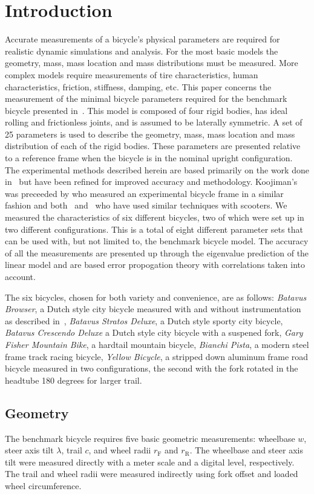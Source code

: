 \documentclass{bmd2010a}
\begin{document}
\section*{Introduction}
Accurate measurements of a bicycle's physical parameters are required for
realistic dynamic simulations and analysis. For the most basic models the
geometry, mass, mass location and mass distributions must be measured. More complex models
require measurements of tire characteristics, human characteristics, friction, stiffness, damping, etc. This
paper concerns the measurement of the minimal bicycle parameters required for
the benchmark bicycle presented in~\cite{Meijaard2007}. This
model is composed of four rigid bodies, has ideal rolling and frictionless joints,
and is assumed to be laterally symmetric. A set of 25
parameters is used to describe the geometry, mass, mass location and
mass distribution of each of the rigid bodies. These parameters are presented
relative to a reference frame when the bicycle is in the nominal upright
configuration. The experimental methods described herein are based primarily on the work
done in~\cite{Kooijman2006} but have been refined for improved accuracy and
methodology. Koojiman's was preceeded by \cite{Roland1971} who measured an experimental bicycle frame in a
similar fashion and both~\cite{Dohring1953} and~\cite{Singh1971} who have used
similar techniques with scooters. We measured the characteristics of six
different bicycles, two of which were set up in two different configurations.
This is a total of eight different parameter sets that can be used with, but not
limited to, the benchmark bicycle model. The accuracy of all the measurements
are presented up through the eigenvalue prediction of the linear model and are
based error propogation theory with correlations taken into account.

The six bicycles, chosen for both variety and convenience, are as follows:
\emph{Batavus Browser}, a Dutch style city bicycle measured with and without
instrumentation as described in~\cite{Kooijman2009a}, \emph{Batavus Stratos
Deluxe}, a Dutch style sporty city bicycle, \emph{Batavus Crescendo Deluxe} a
Dutch style city bicycle with a suspened fork, \emph{Gary Fisher Mountain
Bike}, a hardtail mountain bicycle, \emph{Bianchi Pista}, a modern steel frame
track racing bicycle, \emph{Yellow Bicycle}, a stripped down aluminum frame
road bicycle measured in two configurations, the second with the fork rotated
in the headtube 180 degrees for larger trail.
\subsection*{Geometry}
The benchmark bicycle requires five basic geometric measurements: wheelbase
$w$, steer axis tilt $\lambda$, trail $c$, and wheel radii $r_\mathrm{F}$
and $r_\mathrm{R}$. The wheelbase and steer axis tilt were measured directly
with a meter scale and a digital level, respectively. The trail and wheel radii were
measured indirectly using fork offset and loaded wheel circumference.
\end{document}
